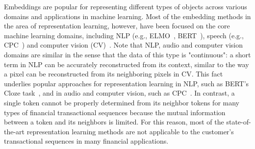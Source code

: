 \documentclass[sigconf, anonymous]{acmart}
\begin{document}
Embeddings are popular for representing different types of objects across various domains and applications in machine learning. 
Most of the embedding methods in the area of representation learning, however, have been focused on the core machine learning domains, including NLP (e.g., ELMO~\citep{Peters2018DeepCW}, BERT~\citep{Devlin2019BERTPO}), speech (e.g., CPC~\citep{Oord2018RepresentationLW}) and computer vision (CV)~\citep{Doersch2015UnsupervisedVR, Oord2018RepresentationLW}.
Note that NLP, audio and computer vision domains are similar in the sense that the data of this type is "continuous": a short term in NLP can be accurately reconstructed from its context, similar to the way a pixel can be reconstructed from its neighboring pixels in CV. This fact underlies popular approaches for representation learning in NLP, such as BERT's Cloze task~\citep{Devlin2019BERTPO}, and in audio and computer vision, such as CPC~\citep{Oord2018RepresentationLW}. In contrast, a single token cannot be properly determined from its neighbor tokens for many types of financial transactional sequences because the mutual information between a token and its neighbors is limited. For this reason, most of the state-of-the-art representation learning methods are not applicable to the customer's transactional sequences in many financial applications.





\end{document}
